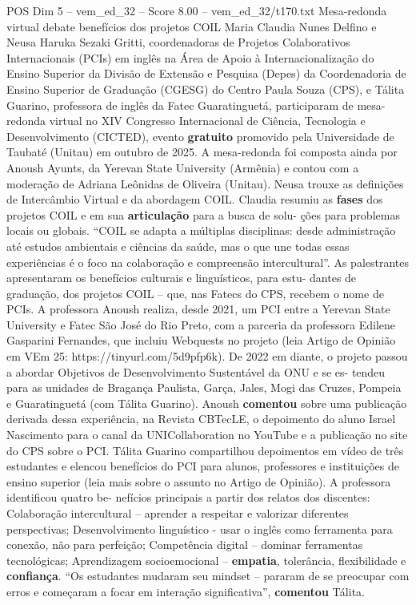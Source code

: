 \begin{textsample}{POS Dim 5 – vem\_ed\_32 – Score 8.00 – vem\_ed\_32/t170.txt}  \label{ex:f5_pos_025}
Mesa-redonda virtual debate benefícios dos projetos COIL Maria Claudia Nunes Delfino e Neusa Haruka Sezaki Gritti, coordenadoras de Projetos Colaborativos Internacionais (PCIs) em inglês na Área de Apoio à Internacionalização do Ensino Superior da Divisão de Extensão e Pesquisa (Depes) da Coordenadoria de Ensino Superior de Graduação (CGESG) do Centro Paula Souza (CPS), e Tálita Guarino, professora de inglês da Fatec Guaratinguetá, participaram de mesa-redonda virtual no XIV Congresso Internacional de Ciência, Tecnologia e Desenvolvimento (CICTED), evento \textbf{gratuito} promovido pela Universidade de Taubaté (Unitau) em outubro de 2025.
A mesa-redonda foi composta ainda por Anoush Ayunts, da Yerevan State University (Armênia) e contou com a moderação de Adriana Leônidas de Oliveira (Unitau).
Neusa trouxe as definições de Intercâmbio Virtual e da abordagem COIL.
Claudia resumiu as \textbf{fases} dos projetos COIL e em sua \textbf{articulação} para a busca de solu- ções para problemas locais ou globais. “COIL se adapta a múltiplas disciplinas: desde administração até estudos ambientais e ciências da saúde, mas o que une todas essas experiências é o foco na colaboração e compreensão intercultural”.
As palestrantes apresentaram os benefícios culturais e linguísticos, para estu- dantes de graduação, dos projetos COIL – que, nas Fatecs do CPS, recebem o nome de PCIs.
A professora Anoush realiza, desde 2021, um PCI entre a Yerevan State University e Fatec São José do Rio Preto, com a parceria da professora Edilene Gasparini Fernandes, que incluiu Webquests no projeto (leia Artigo de Opinião em VEm 25: https://tinyurl.com/5d9pfp6k).
De 2022 em diante, o projeto passou a abordar Objetivos de Desenvolvimento Sustentável da ONU e se es- tendeu para as unidades de Bragança Paulista, Garça, Jales, Mogi das Cruzes, Pompeia e Guaratinguetá (com Tálita Guarino).
Anoush \textbf{comentou} sobre uma publicação derivada dessa experiência, na Revista CBTecLE, o depoimento do aluno Israel Nascimento para o canal da UNICollaboration no YouTube e a publicação no site do CPS sobre o PCI.
Tálita Guarino compartilhou depoimentos em vídeo de três estudantes e elencou benefícios do PCI para alunos, professores e instituições de ensino superior (leia mais sobre o assunto no Artigo de Opinião).
A professora identificou quatro be- nefícios principais a partir dos relatos dos discentes: Colaboração intercultural – aprender a respeitar e valorizar diferentes perspectivas; Desenvolvimento linguístico - usar o inglês como ferramenta para conexão, não para perfeição; Competência digital – dominar ferramentas tecnológicas; Aprendizagem socioemocional – \textbf{empatia}, tolerância, flexibilidade e \textbf{confiança}. “Os estudantes mudaram seu mindset – pararam de se preocupar com erros e começaram a focar em interação significativa”, \textbf{comentou} Tálita.

\end{textsample}
